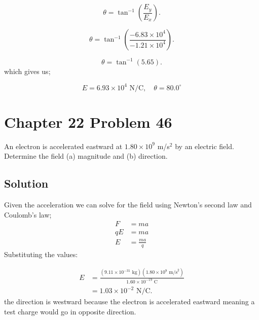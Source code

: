 \documentclass{article}
\begin{document}
\[
    \theta = \tan^{-1} \left(\frac{E_y}{E_x}\right).
\]

\[
    \theta = \tan^{-1} \left(\frac{-6.83 \times 10^4}{-1.21 \times 10^4}\right).
\]

\[
    \theta = \tan^{-1} (5.65).
\]
which gives us;

\[
    \boxed{E = 6.93 \times 10^4 \text{ N/C}, \quad \theta = 80.0^\circ}
\]



\section*{Chapter 22 Problem 46}
An electron is accelerated eastward at $1.80 \times 10^9$ m/s$^2$ by an electric field. Determine the field (a) magnitude and
(b) direction.

\subsection*{Solution}
Given the acceleration we can solve for the field using Newton's second law and Coulomb's law;
\begin{align*}
	F &= ma \\
	qE &= ma \\
	E &= \frac{ma}{q}
\end{align*}
Substituting the values:

\begin{align*}
	E &= \frac{(9.11 \times 10^{-31} \text{ kg}) (1.80 \times 10^9 \text{ m/s}^2)}{1.60 \times 10^{-19} \text{ C}} \\
	&= \boxed{1.03 \times 10^{-2} \text{ N/C}}.
\end{align*}
the direction is westward because the electron is accelerated eastward meaning a test charge would go in opposite direction.
\end{document}
